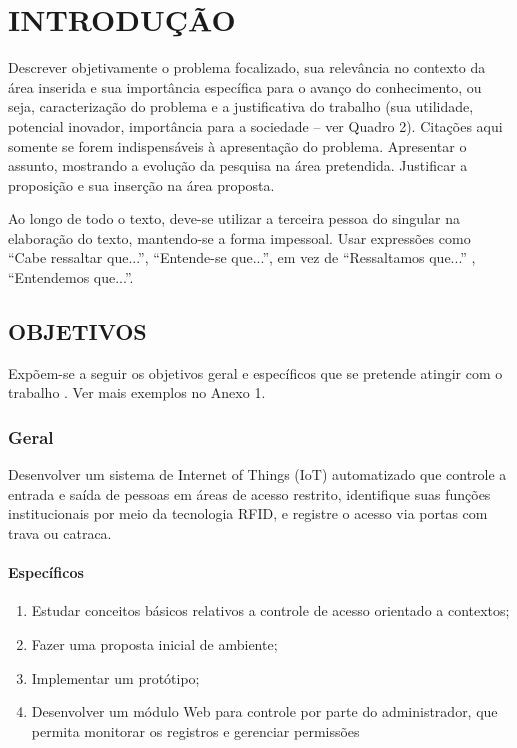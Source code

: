 \chapter{INTRODUÇÃO}\label{chp:INTRODUCAO}

Descrever objetivamente o problema focalizado, sua relevância no contexto da área inserida e sua importância específica para o avanço do conhecimento, ou seja, caracterização do problema e a justificativa do trabalho (sua utilidade, potencial inovador, importância para a sociedade – ver Quadro 2). Citações aqui somente se forem indispensáveis à apresentação do problema. Apresentar o assunto, mostrando a evolução da pesquisa na área pretendida. Justificar a proposição e sua inserção na área proposta.

Ao longo de todo o texto, deve-se utilizar a terceira pessoa do singular na elaboração do texto, mantendo-se a forma impessoal. Usar expressões como “Cabe ressaltar que...”, “Entende-se que...”, em vez de “Ressaltamos que...” , “Entendemos que...”. 


\section{OBJETIVOS}\label{sec:OBJETIVOS}
Expõem-se a seguir os objetivos geral e específicos que se pretende atingir com o trabalho . Ver mais exemplos no Anexo 1.

\subsection{Geral}\label{sec:Geral}
Desenvolver um sistema de Internet of Things (IoT) automatizado que controle a entrada e saída de pessoas em áreas de acesso restrito, identifique suas funções institucionais por meio da tecnologia RFID, e registre o acesso via portas com trava ou catraca.


\subsubsection{Específicos}\label{sec:Especificos}
\begin{enumerate}
	\item Estudar conceitos básicos relativos a controle de acesso orientado a contextos; 
	
	\item Fazer uma proposta inicial de ambiente;
	
	\item Implementar um protótipo;
	
	\item Desenvolver um módulo Web para controle por parte do administrador, que permita monitorar os registros e gerenciar permissões
\end{enumerate}


